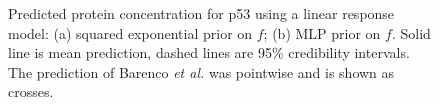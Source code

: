 \documentclass[english]{article}
\begin{document}
%
\begin{figure}[ht]\vspace{-0.4cm}
\begin{center}
\end{center}
\vspace{-0.4cm}

\caption{\small Predicted protein concentration for p53 using a linear response 
model: (a) squared exponential prior on $f$; (b) MLP prior on $f$. Solid line is mean 
prediction, dashed
lines are 95\% credibility intervals. 
The prediction of Barenco \emph{et al.} was pointwise and is shown as crosses.}
\label{cap:barencoComparisonProfile}\vspace{-0.3cm}
\end{figure}%
\end{document}
